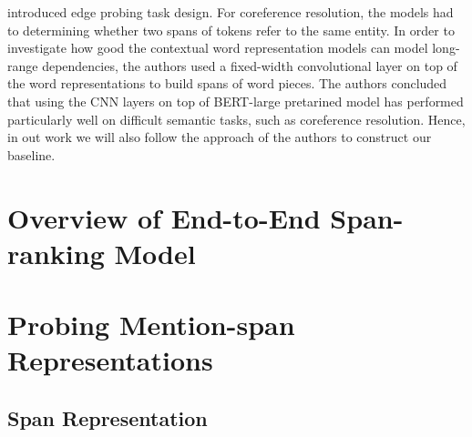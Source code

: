 \documentclass[11pt]{article}
\begin{document}
\textcite{tenney2019context} introduced edge probing task design. For coreference resolution, the models had to determining whether two spans of tokens refer to the same entity. In order to investigate how good the contextual word representation models can model long-range dependencies, the authors used a fixed-width convolutional layer on top of the word representations to build spans of word pieces. The authors concluded that using the CNN layers on top of BERT-large pretarined model has performed particularly well on difficult semantic tasks, such as coreference resolution. Hence, in out work we will also follow the approach of the authors to construct our baseline. 

\section{Overview of End-to-End Span-ranking Model}

\section{Probing Mention-span Representations}


\subsection{Span Representation}
\label{subsection:spanreps}
\end{document}
